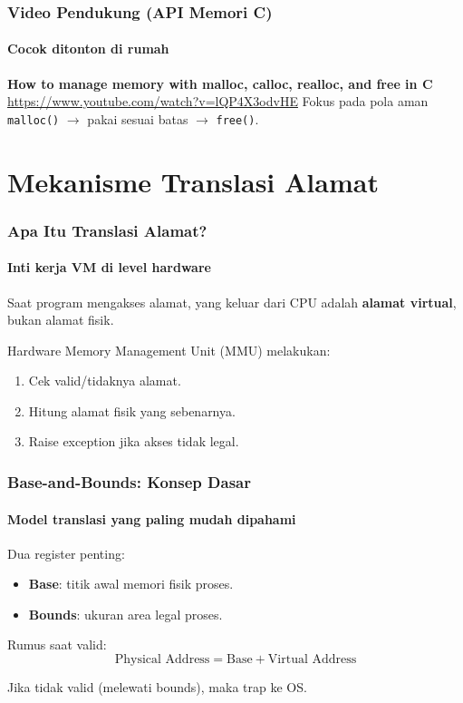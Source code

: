 \documentclass[t,aspectratio=169,xcolor=dvipsnames]{beamer}
\begin{document}
\begin{frame}
    \frametitle{Video Pendukung (API Memori C)}
    \framesubtitle{Cocok ditonton di rumah}
    \small
    \textbf{How to manage memory with malloc, calloc, realloc, and free in C}\\
    \scriptsize \url{https://www.youtube.com/watch?v=lQP4X3odvHE}
    \normalsize
    \vspace{0.2cm}
    Fokus pada pola aman \texttt{malloc()} $\rightarrow$ pakai sesuai batas $\rightarrow$ \texttt{free()}.
\end{frame}

\section{Mekanisme Translasi Alamat}

\begin{frame}
    \frametitle{Apa Itu Translasi Alamat?}
    \framesubtitle{Inti kerja VM di level hardware}
    \small
    Saat program mengakses alamat, yang keluar dari CPU adalah \textbf{alamat virtual}, bukan alamat fisik.

    \vspace{0.2cm}
    Hardware Memory Management Unit (MMU) melakukan:
    \begin{enumerate}
        \item Cek valid/tidaknya alamat.
        \item Hitung alamat fisik yang sebenarnya.
        \item Raise exception jika akses tidak legal.
    \end{enumerate}
\end{frame}

\begin{frame}
    \frametitle{Base-and-Bounds: Konsep Dasar}
    \framesubtitle{Model translasi yang paling mudah dipahami}
    \small
    Dua register penting:
    \begin{itemize}
        \item \textbf{Base}: titik awal memori fisik proses.
        \item \textbf{Bounds}: ukuran area legal proses.
    \end{itemize}

    Rumus saat valid:
    \[\text{Physical Address} = \text{Base} + \text{Virtual Address}\]

    Jika tidak valid (melewati bounds), maka trap ke OS.
\end{frame}
\end{document}
